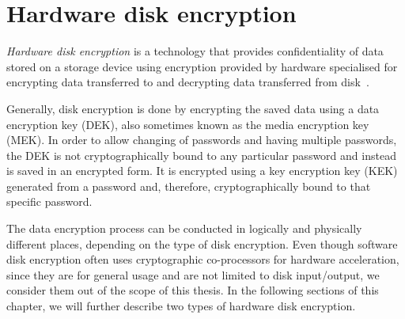 
\chapter{Hardware disk encryption}
\label{chapter_hardware_disk_encryption}




\emph{Hardware disk encryption} is a technology that provides confidentiality of data stored on a storage device using encryption provided by hardware specialised for encrypting data transferred to and decrypting data transferred from disk~\cite{pp_for_fde}.

Generally, disk encryption is done by encrypting the saved data using a data encryption key (DEK), also sometimes known as the media encryption key (MEK). In order to allow changing of passwords and having multiple passwords, the DEK is not cryptographically bound to any particular password and instead is saved in an encrypted form. It is encrypted using a key encryption key (KEK) generated from a password and, therefore, cryptographically bound to that specific password.


The data encryption process can be conducted in logically and physically different places, depending on the type of disk encryption. 
Even though software disk encryption often uses cryptographic co-processors for hardware acceleration, since they are for general usage and are not limited to disk input/output, we consider them out of the scope of this thesis.
In the following sections of this chapter, we will further describe two types of hardware disk encryption.





